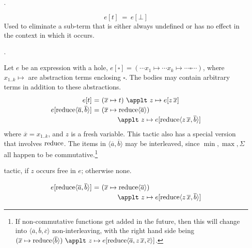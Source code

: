 \Obligations \self.

\[e[t] ~=~ e[\bot]\]
%
Used to eliminate a sub-term that is either always undefined or has no effect
in the context in which it occurs.

\Obligations \self.

\vspace{3mm}
Let $e$ be an expression with a hole, $e[\square] = (\cdots x_1 \mapsto \cdots x_k\mapsto \cdots \square \cdots)$, 
where $x_{1..k}\mapsto$ are abstraction terms enclosing $\square$. The bodies may contain arbitrary terms
in addition to these abstractions.
%
\[\renewcommand\arraystretch{1.2}
  \begin{array}{@{}r@{}c@{}l@{}}
  e[t] & ~=~ & (\overline{x}\mapsto t) ~\applt~ z\mapsto e[z\,\overline{x}] \\
  e[\reduce \langle\overline{a},\overline{b}\rangle] & ~=~ &
     (\overline{x}\mapsto \reduce\langle\overline{a}\rangle) \\ 
     ~&~&~~~~~~~\applt~ z\mapsto e[\reduce\langle z\,\overline{x}, \overline{b}\rangle]
  \end{array}\]
%
where $\overline{x}=x_{1..k}$, and $z$ is a fresh variable.
This tactic also has a special version that involves $\operatorname{reduce}$.
The items in $\langle \overline{a},\overline{b}\rangle$ may be interleaved, since
$\min,\max,\Sigma$ all happen to be commutative.\footnote{If non-commutative functions get added in the future, then this will change into $\langle \overline{a}, \overline{b}, \overline{c}\rangle$ non-interleaving, with the right hand side being $(\overline{x}\mapsto \reduce\langle\overline{b}\rangle) ~\applt~ z\mapsto e[\reduce\langle \overline{a}, z\,\overline{x}, \overline{c}\rangle]$.}

\Obligations tactic, if $z$ occurs free in $e$; otherwise none.

%
%
\[\renewcommand\arraystretch{1.2}
  \begin{array}{@{}r@{}c@{}l@{}}
  e[\reduce \langle\overline{a},\overline{b}\rangle] & ~=~ &
     (\overline{x}\mapsto \reduce\langle\overline{a}\rangle) \\ 
     ~&~&~~~~~~~\applt~ z\mapsto e[\reduce\langle z\,\overline{x}, \overline{b}\rangle]
  \end{array}\]
%


